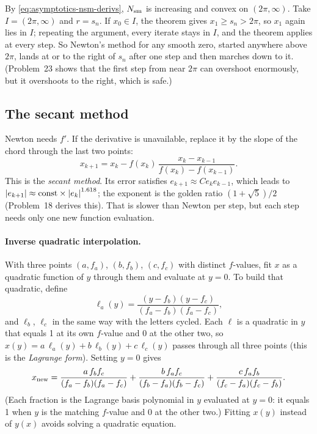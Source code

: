 By \cref{eq:asymptotics-nsm-derivs}, $N_{\mathrm{sm}}$ is increasing and convex on $(2\pi,\infty)$. Take $I=(2\pi,\infty)$ and $r=s_n$. If $x_0\in I$, the theorem gives $x_1\ge s_n>2\pi$, so $x_1$ again lies in $I$; repeating the argument, every iterate stays in $I$, and the theorem applies at every step. So Newton's method for any smooth zero, started anywhere above $2\pi$, lands at or to the right of $s_n$ after one step and then marches down to it. (Problem~23 shows that the first step from near $2\pi$ can overshoot enormously, but it overshoots to the right, which is safe.)

\subsection{The secant method}

Newton needs $f'$. If the derivative is unavailable, replace it by the slope of the chord through the last two points:
\begin{equation}
x_{k+1}=x_k-f(x_k)\,\frac{x_k-x_{k-1}}{f(x_k)-f(x_{k-1})} .
\label{eq:asymptotics-secant}
\end{equation}
This is the \emph{secant method}. Its error satisfies $e_{k+1}\approx Ce_ke_{k-1}$, which leads to $\left\lvert e_{k+1}\right\rvert\approx\text{const}\times\left\lvert e_k\right\rvert^{1.618}$; the exponent is the golden ratio $(1+\sqrt5)/2$ (Problem~18 derives this). That is slower than Newton per step, but each step needs only one new function evaluation.

\paragraph{Inverse quadratic interpolation.} With three points $(a,f_a)$, $(b,f_b)$, $(c,f_c)$ with distinct $f$-values, fit $x$ as a quadratic function of $y$ through them and evaluate at $y=0$. To build that quadratic, define
\[
\ell_a(y)=\frac{(y-f_b)(y-f_c)}{(f_a-f_b)(f_a-f_c)},
\]
and $\ell_b$, $\ell_c$ in the same way with the letters cycled. Each $\ell$ is a quadratic in $y$ that equals 1 at its own $f$-value and 0 at the other two, so $x(y)=a\,\ell_a(y)+b\,\ell_b(y)+c\,\ell_c(y)$ passes through all three points (this is the \emph{Lagrange form}). Setting $y=0$ gives
\[
x_{\rm new}=\frac{a\,f_bf_c}{(f_a-f_b)(f_a-f_c)}+\frac{b\,f_af_c}{(f_b-f_a)(f_b-f_c)}+\frac{c\,f_af_b}{(f_c-f_a)(f_c-f_b)} .
\]
(Each fraction is the Lagrange basis polynomial in $y$ evaluated at $y=0$: it equals 1 when $y$ is the matching $f$-value and 0 at the other two.) Fitting $x(y)$ instead of $y(x)$ avoids solving a quadratic equation.

